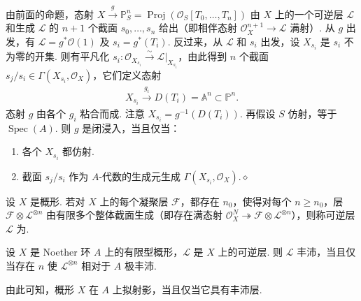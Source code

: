 \begin{remark}\label{item:ag-2-1-8}
由前面的命题，态射 $X\xrightarrow g\mathbb P_S^n=\operatorname{Proj}(\mathcal O_S[T_0,\ldots,T_n])$ 由 $X$ 上的一个可逆层 $\mathcal L$ 和生成 $\mathcal L$ 的 $n+1$ 个截面 $s_0,\ldots,s_n$ 给出（即相伴态射 $\mathcal O_X^{n+1}\longrightarrow\mathcal L$ 满射）. 从 $g$ 出发，有 $\mathcal L=g^*\mathcal O(1)$ 及 $s_i=g^*(T_i)$. 反过来，从 $\mathcal L$ 和 $s_i$ 出发，设 $X_{s_i}$ 是 $s_i$ 不为零的开集. 则有平凡化 $s_i:\mathcal O_{X_{s_i}}\xrightarrow\sim\mathcal L|_{X_{s_i}}$，由此得到 $n$ 个截面 $s_j/s_i\in\Gamma(X_{s_i},\mathcal O_X)$，它们定义态射
\begin{align*}
X_{s_i}\xrightarrow{g_i}D(T_i)=\mathbb A^n\subset\mathbb P^n.
\end{align*}
态射 $g$ 由各个 $g_i$ 粘合而成. 注意 $X_{s_i}=g^{-1}(D(T_i))$. 再假设 $S$ 仿射，等于 $\operatorname{Spec}(A)$. 则 $g$ 是闭浸入，当且仅当：
\begin{enumerate}[label=\roman*)]
\item 各个 $X_{s_i}$ 都仿射.
\item 截面 $s_j/s_i$ 作为 $A$-代数的生成元生成 $\Gamma(X_{s_i},\mathcal O_X)$.\unskip\nobreak\hfill\ensuremath{\diamond}
\end{enumerate}
\renewcommand{\envenddiamond}{}%
\end{remark}
\begin{definition}\label{item:ag-2-1-9}
设 $X$ 是概形. 若对 $X$ 上的每个凝聚层 $\mathcal F$，都存在 $n_0$，使得对每个 $n\geqslant n_0$，层 $\mathcal F\otimes\mathcal L^{\otimes n}$ 由有限多个整体截面生成（即存在满态射 $\mathcal O_X^N\twoheadrightarrow\mathcal F\otimes\mathcal L^{\otimes n}$），则称可逆层 $\mathcal L$ 为.
\end{definition}
\begin{theorem}\label{item:ag-2-1-10}
设 $X$ 是 Noether 环 $A$ 上的有限型概形，$\mathcal L$ 是 $X$ 上的可逆层. 则 $\mathcal L$ 丰沛，当且仅当存在 $n$ 使 $\mathcal L^{\otimes n}$ 相对于 $A$ 极丰沛.
\end{theorem}
由此可知，概形 $X$ 在 $A$ 上拟射影，当且仅当它具有丰沛层.
